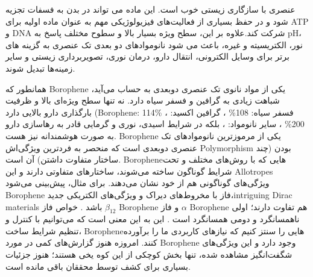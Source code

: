 عنصری با سازگاری زیستی خوب است. این ماده می تواند در بدن به فسفات تجزیه شود و در حفظ بسیاری از فعالیت‌های فیزیولوژیکی مهم به عنوان ماده اولیه برای \gls{ATP} و \gls{DNA} شرکت کند.\cite{shaoBiodegradableBlackPhosphorusbased2016,taoBlackPhosphorusNanosheets2017}علاوه بر این، سطح ویژه بسیار بالا و سطوح مختلف پاسخ به \gls{pH}، نور، الکتریسیته و غیره، باعث می شود نانوموادهای دو بعدی تک عنصری به گزینه های برتر برای وسایل الکترونی، انتقال دارو، درمان نوری، تصویربرداری زیستی و سایر زمینه‌ها تبدیل شوند. \cite{liEngineeredFunctionalized2D2020,shiPHSensitiveNanoscaleMaterials2020}

همانطور که \gls{Borophene} یکی از مواد نانوی تک عنصری دوبعدی به حساب می‌آید، شباهت زیادی به گرافین و فسفر سیاه دارد. نه تنها سطح ویژه‌ای بالا و ظرفیت بارگذاری دارو بالایی دارد (\gls{Borophene}: 114\% \cite{jiNovelTopDownSynthesis2018}، فسفر سیاه: 108\% \cite{taoBlackPhosphorusNanosheets2017}، گرافین اکسید: 200\% \cite{zhangFunctionalGrapheneOxide2010}، سایر نانومواد: ، بلکه در شرایط اسیدی، نوری و گرمایی قادر به رهاسازی دارو به صورت هوشمندانه نیز هست. \gls{Borophene} یکی از مرموزترین نانوموادهای تک عنصری دوبعدی است که منحصر به فردترین ویژگی‌اش \gls{Polymorphism} بودن (چند ساختار متفاوت داشتن) آن است. \gls{Borophene}‌هایی که با روش‌های مختلف و تحت شرایط گوناگون ساخته می‌شوند، ساختارهای متفاوتی دارند و این \gls{Allotropes} ویژگی‌های گوناگونی هم از خود نشان می‌دهند. برای مثال، پیش‌بینی می‌شود \gls{Borophene} فاز  با مخروط‌های دیراک و ویژگی‌های الکتریکی جدید،\gls{intriguing Dirac materials} باشد \cite{zhouSemimetallicTwoDimensionalBoron2014}. خواص فاز $\beta_{12}$ \gls{Borophene} و فاز $\alpha$ \gls{Borophene} هم تفاوت دارند؛ اولی ناهمسانگرد و دومی همسانگرد است \cite{zhouSuperiorLatticeThermal2017, xiaoLatticeThermalConductivity2017}. این به این معنی است که می‌توانیم با کنترل و تنظیم شرایط ساخت، \gls{Borophene}‌هایی را سنتز کنیم که نیازهای کاربردی ما را برآورده کنند. امروزه هنوز گزارش‌های کمی در مورد \gls{Borophene} وجود دارد و این ویژگی‌های شگفت‌انگیز مشاهده شده، تنها بخش کوچکی از این کوه یخی هستند؛ هنوز جزئیات بسیاری برای کشف توسط محققان باقی مانده است.

